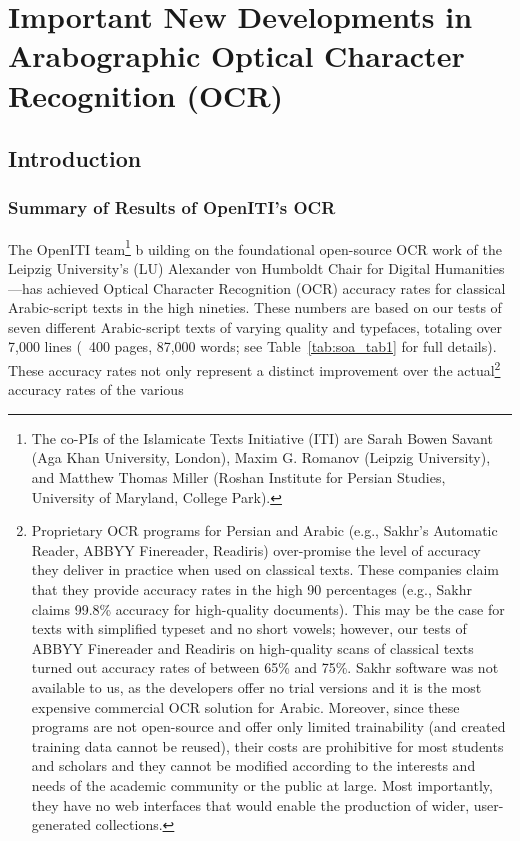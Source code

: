 ﻿\chapter{Important New Developments in Arabographic Optical Character Recognition (OCR)}

\section{Introduction}

\subsection{Summary of Results of OpenITI’s OCR}

The OpenITI team\footnote{The co-PIs of the Islamicate Texts Initiative (ITI)
are Sarah Bowen Savant (Aga Khan University, London), Maxim G. Romanov (Leipzig
University), and Matthew Thomas Miller (Roshan Institute for Persian Studies,
University of Maryland, College Park).} b uilding on the foundational
open-source OCR work of the Leipzig University’s (LU) Alexander von Humboldt
Chair for Digital Humanities—has achieved Optical Character Recognition (OCR)
accuracy rates for classical Arabic-script texts in the high nineties. These
numbers are based on our tests of seven different Arabic-script texts of
varying quality and typefaces, totaling over 7,000 lines (~400 pages, 87,000
words; see Table~\ref{tab:soa_tab1} for full details). These accuracy rates not
only represent a distinct improvement over the actual\footnote{Proprietary OCR
programs for Persian and Arabic (e.g., Sakhr’s Automatic Reader, ABBYY
Finereader, Readiris)
over-promise the level of accuracy they deliver in practice when used on
classical texts. These companies claim that they provide accuracy rates in the
high 90 percentages (e.g., Sakhr claims 99.8\% accuracy for high-quality
documents). This may be the case for texts with simplified typeset and no short
vowels; however, our tests of ABBYY Finereader and Readiris on high-quality
scans of classical texts turned out accuracy rates of between 65\% and 75\%.
Sakhr software was not available to us, as the developers offer no trial
versions and it is the most expensive commercial OCR solution for Arabic.
Moreover, since these programs are not open-source and offer only limited
trainability (and created training data cannot be reused), their costs are
prohibitive for most students and scholars and they cannot be modified
according to the interests and needs of the academic community or the public at
large. Most importantly, they have no web interfaces that would enable the
production of wider, user-generated collections.} accuracy rates of the various
